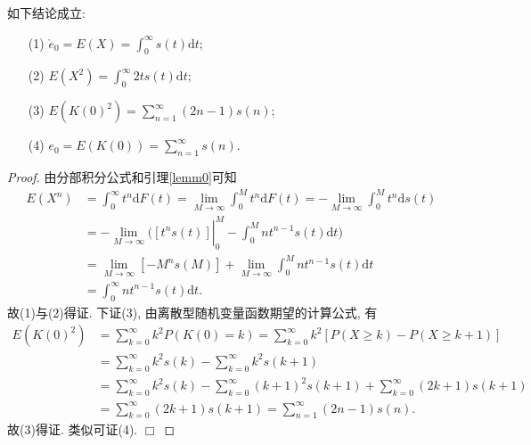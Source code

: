 \documentclass[a4paper,openany, 10pt]{ctexbook}
\def\qed{\hfill$\Box$\medskip}
\begin{document}
\begin{proposition}如下结论成立:
    \begin{enumerate}
        \item[(1)] $\mathring{e}_0 = E(X) = \int_0^{\infty}s(t)\mathrm{d}t;$
        \item[(2)] $E(X^2) = \int_{0}^{\infty} 2ts(t)\mathrm{d}t;$
        \item[(3)] $E(K(0)^2) = \sum_{n = 1}^{\infty} (2n-1)s(n);$
        \item[(4)] $e_0=E(K(0)) = \sum_{n = 1}^{\infty} s(n).$
    \end{enumerate}
\end{proposition}
\begin{proof}由分部积分公式和引理\ref{lemm0}可知
    \begin{equation*}
        \begin{aligned}
            {E}\left(X^{n}\right) & =\int_0^\infty t^n\mathrm{d}F(t)=\lim_{M\to\infty}\int_0^Mt^n\mathrm{d}F(t)=-\lim_{M\to\infty}\int_0^Mt^n\mathrm{d}s(t) \\
                                  & \left.=-\lim_{M\to\infty}(\left[t^ns(t)\right]\right|_0^M-\int_0^Mnt^{n-1}s(t)\mathrm{d}t)                              \\
                                  & =\lim_{M\to\infty}[-M^ns(M)]+\lim_{M\to\infty}\int_0^Mnt^{n-1}s(t)\mathrm{d}t                                           \\
                                  & =\int_0^\infty nt^{n-1}s(t)\mathrm{d}t.
        \end{aligned}
    \end{equation*}
    故(1)与(2)得证. 下证(3), 由离散型随机变量函数期望的计算公式, 有
    \begin{align*}
        E(K(0)^2) & = \sum_{k = 0}^{\infty} k^2P(K(0) = k)
        = \sum_{k = 0}^{\infty} k^2[P(X \geq k) - P(X \geq k+1)]                                                            \\
                  & = \sum_{k = 0}^{\infty} k^2s(k) - \sum_{k = 0}^{\infty} k^2s(k+1)                                       \\
                  & =\sum_{k = 0}^{\infty} k^2s(k) - \sum_{k = 0}^{\infty} (k+1)^2s(k+1)+\sum_{k = 0}^{\infty} (2k+1)s(k+1) \\
                  & = \sum_{k = 0}^{\infty} (2k+1)s(k+1)                              = \sum_{n = 1}^{\infty} (2n-1)s(n).
    \end{align*}
    故(3)得证. 类似可证(4). \qed
\end{proof}
\end{document}
